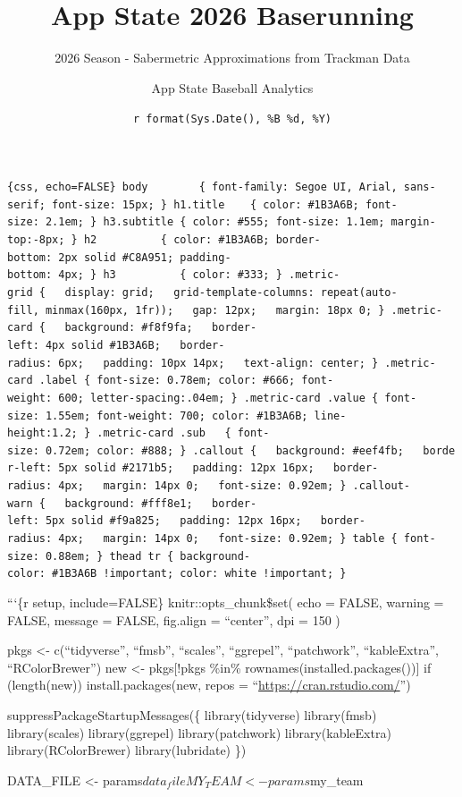\documentclass[
]{article}
\title{App State 2026 Baserunning}
\subtitle{2026 Season - Sabermetric Approximations from Trackman Data}
\author{App State Baseball Analytics}
\date{\texttt{r\ format(Sys.Date(),\ \textquotesingle{}\%B\ \%d,\ \%Y\textquotesingle{})}}
\begin{document}
\maketitle

{
\setcounter{tocdepth}{3}
\tableofcontents
}
\texttt{\{css,\ echo=FALSE\}\ body\ \ \ \ \ \ \ \ \{\ font-family:\ \textquotesingle{}Segoe\ UI\textquotesingle{},\ Arial,\ sans-serif;\ font-size:\ 15px;\ \}\ h1.title\ \ \ \ \{\ color:\ \#1B3A6B;\ font-size:\ 2.1em;\ \}\ h3.subtitle\ \{\ color:\ \#555;\ font-size:\ 1.1em;\ margin-top:-8px;\ \}\ h2\ \ \ \ \ \ \ \ \ \ \{\ color:\ \#1B3A6B;\ border-bottom:\ 2px\ solid\ \#C8A951;\ padding-bottom:\ 4px;\ \}\ h3\ \ \ \ \ \ \ \ \ \ \{\ color:\ \#333;\ \}\ .metric-grid\ \{\ \ \ display:\ grid;\ \ \ grid-template-columns:\ repeat(auto-fill,\ minmax(160px,\ 1fr));\ \ \ gap:\ 12px;\ \ \ margin:\ 18px\ 0;\ \}\ .metric-card\ \{\ \ \ background:\ \#f8f9fa;\ \ \ border-left:\ 4px\ solid\ \#1B3A6B;\ \ \ border-radius:\ 6px;\ \ \ padding:\ 10px\ 14px;\ \ \ text-align:\ center;\ \}\ .metric-card\ .label\ \{\ font-size:\ 0.78em;\ color:\ \#666;\ font-weight:\ 600;\ letter-spacing:.04em;\ \}\ .metric-card\ .value\ \{\ font-size:\ 1.55em;\ font-weight:\ 700;\ color:\ \#1B3A6B;\ line-height:1.2;\ \}\ .metric-card\ .sub\ \ \ \{\ font-size:\ 0.72em;\ color:\ \#888;\ \}\ .callout\ \{\ \ \ background:\ \#eef4fb;\ \ \ border-left:\ 5px\ solid\ \#2171b5;\ \ \ padding:\ 12px\ 16px;\ \ \ border-radius:\ 4px;\ \ \ margin:\ 14px\ 0;\ \ \ font-size:\ 0.92em;\ \}\ .callout-warn\ \{\ \ \ background:\ \#fff8e1;\ \ \ border-left:\ 5px\ solid\ \#f9a825;\ \ \ padding:\ 12px\ 16px;\ \ \ border-radius:\ 4px;\ \ \ margin:\ 14px\ 0;\ \ \ font-size:\ 0.92em;\ \}\ table\ \{\ font-size:\ 0.88em;\ \}\ thead\ tr\ \{\ background-color:\ \#1B3A6B\ !important;\ color:\ white\ !important;\ \}}

```\{r setup, include=FALSE\} knitr::opts\_chunk\$set( echo = FALSE,
warning = FALSE, message = FALSE, fig.align = ``center'', dpi = 150 )

pkgs \textless- c(``tidyverse'', ``fmsb'', ``scales'', ``ggrepel'',
``patchwork'', ``kableExtra'', ``RColorBrewer'') new \textless-
pkgs{[}!pkgs \%in\% rownames(installed.packages()){]} if (length(new))
install.packages(new, repos = ``\url{https://cran.rstudio.com/}'')

suppressPackageStartupMessages(\{ library(tidyverse) library(fmsb)
library(scales) library(ggrepel) library(patchwork) library(kableExtra)
library(RColorBrewer) library(lubridate) \})

DATA\_FILE \textless- params\(data_file
MY_TEAM   <- params\)my\_team
\end{document}
